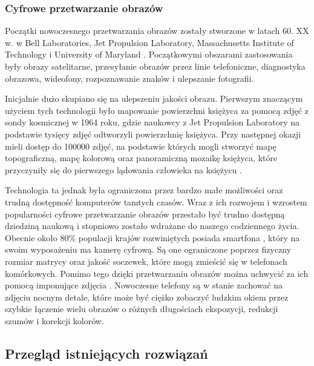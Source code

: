 \subsubsection{Cyfrowe przetwarzanie obrazów}
Początki nowoczesnego przetwarzania obrazów zostały stworzone w latach 60. XX w. w Bell Laboratories, Jet Propulsion Laboratory, Massachusetts Institute of Technology i University of Maryland \cite{computerProcessing}. 
Początkowymi obszarami zastosowania były obrazy satelitarne, przesyłanie obrazów przez linie telefoniczne, diagnostyka obrazowa, wideofony, rozpoznawanie znaków i ulepszanie fotografii. 

Inicjalnie dużo skupiano się na ulepszeniu jakości obrazu. Pierwszym znaczącym użyciem tych technologii było mapowanie powierzchni księżyca za pomocą zdjęć z sondy kosmicznej w 1964 roku, gdzie naukowcy z Jet Propulsion Laboratory na podstawie tysięcy zdjęć odtworzyli powierzchnię księżyca. 
Przy następnej okazji mieli dostęp do 100000 zdjęć, na podstawie których mogli stworzyć mapę topograficzną, mapę kolorową oraz panoramiczną mozaikę księżyca, które przyczyniły się do pierwszego lądowania człowieka na księżycu \cite{digitalImageProcessing}.

Technologia ta jednak była ograniczona przez bardzo małe możliwości oraz trudną dostępność komputerów tamtych czasów. 
Wraz z ich rozwojem i wzrostem popularności cyfrowe przetwarzanie obrazów przestało być trudno dostępną dziedziną naukową i stopniowo zostało wdrażane do naszego codziennego życia. 
Obecnie około 80\% populacji krajów rozwiniętych posiada smartfona \cite{smartphones}, który na swoim wyposażeniu ma kamerę cyfrową. 
Są one ograniczone poprzez fizyczny rozmiar matrycy oraz jakość soczewek, które mogą zmieścić się w telefonach komórkowych. 
Pomimo tego dzięki przetwarzaniu obrazów można uchwycić za ich pomocą imponujące zdjęcia \cite{pixel}. 
Nowoczesne telefony są w stanie zachować na zdjęciu nocnym detale, które może być ciężko zobaczyć ludzkim okiem \cite{nightMode} przez szybkie łączenie wielu obrazów o różnych długościach ekspozycji, redukcji szumów i korekcji kolorów.  

\subsection{Przegląd istniejących rozwiązań}

